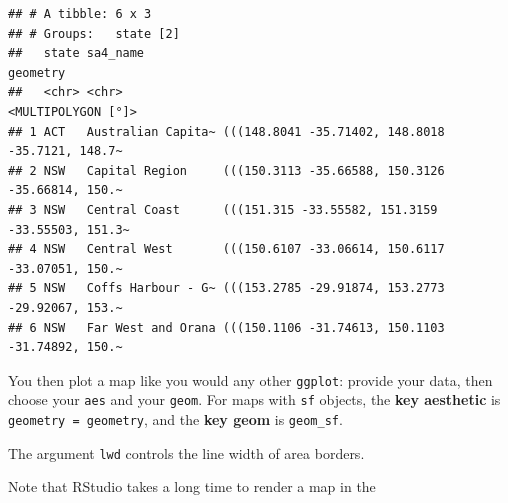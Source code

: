 \documentclass[]{book}
\newenvironment{Shaded}{\begin{snugshade}}{\end{snugshade}}
\newcommand{\CharTok}[1]{\textcolor[rgb]{0.31,0.60,0.02}{#1}}
\newcommand{\DataTypeTok}[1]{\textcolor[rgb]{0.13,0.29,0.53}{#1}}
\newcommand{\DecValTok}[1]{\textcolor[rgb]{0.00,0.00,0.81}{#1}}
\newcommand{\KeywordTok}[1]{\textcolor[rgb]{0.13,0.29,0.53}{\textbf{#1}}}
\newcommand{\NormalTok}[1]{#1}
\newcommand{\OperatorTok}[1]{\textcolor[rgb]{0.81,0.36,0.00}{\textbf{#1}}}
\newcommand{\OtherTok}[1]{\textcolor[rgb]{0.56,0.35,0.01}{#1}}
\newcommand{\StringTok}[1]{\textcolor[rgb]{0.31,0.60,0.02}{#1}}
\begin{document}
\begin{verbatim}
## # A tibble: 6 x 3
## # Groups:   state [2]
##   state sa4_name                                                   geometry
##   <chr> <chr>                                            <MULTIPOLYGON [°]>
## 1 ACT   Australian Capita~ (((148.8041 -35.71402, 148.8018 -35.7121, 148.7~
## 2 NSW   Capital Region     (((150.3113 -35.66588, 150.3126 -35.66814, 150.~
## 3 NSW   Central Coast      (((151.315 -33.55582, 151.3159 -33.55503, 151.3~
## 4 NSW   Central West       (((150.6107 -33.06614, 150.6117 -33.07051, 150.~
## 5 NSW   Coffs Harbour - G~ (((153.2785 -29.91874, 153.2773 -29.92067, 153.~
## 6 NSW   Far West and Orana (((150.1106 -31.74613, 150.1103 -31.74892, 150.~
\end{verbatim}

You then plot a map like you would any other \texttt{ggplot}: provide your data, then choose your \texttt{aes} and your \texttt{geom}. For maps with \texttt{sf} objects, the \textbf{key aesthetic} is \texttt{geometry\ =\ geometry}, and the \textbf{key geom} is \texttt{geom\_sf}.

The argument \texttt{lwd} controls the line width of area borders.

Note that RStudio takes a long time to render a map in the

\begin{Shaded}
\end{Shaded}
\end{document}

